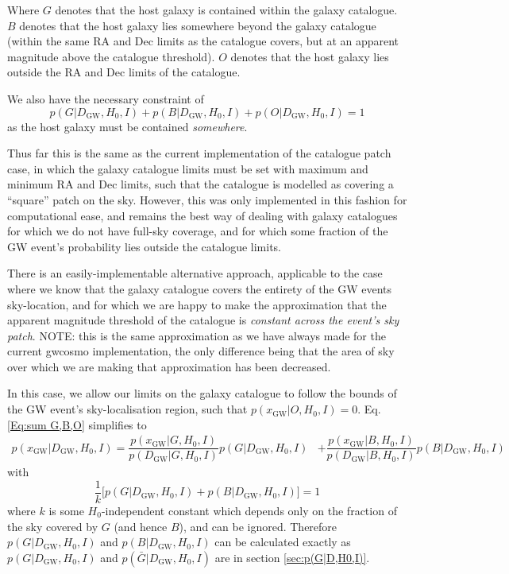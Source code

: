 \documentclass[a4paper,10pt]{article}
\begin{document}
Where $G$ denotes that the host galaxy is contained within the galaxy catalogue.  $B$ denotes that the host galaxy lies somewhere beyond the galaxy catalogue (within the same RA and Dec limits as the catalogue covers, but at an apparent magnitude above the catalogue threshold).  $O$ denotes that the host galaxy lies outside the RA and Dec limits of the catalogue.

We also have the necessary constraint of 
\begin{equation}
p(G|D_{\text{GW}},H_0,I) + p(B|D_{\text{GW}},H_0,I) + p(O|D_{\text{GW}},H_0,I) = 1
\end{equation}
as the host galaxy must be contained \emph{somewhere}.

Thus far this is the same as the current implementation of the catalogue patch case, in which the galaxy catalogue limits must be set with maximum and minimum RA and Dec limits, such that the catalogue is modelled as covering a ``square'' patch on the sky.  However, this was only implemented in this fashion for computational ease, and remains the best way of dealing with galaxy catalogues for which we do not have full-sky coverage, and for which some fraction of the GW event's probability lies outside the catalogue limits.

There is an easily-implementable alternative approach, applicable to the case where we know that the galaxy catalogue covers the entirety of the GW events sky-location, and for which we are happy to make the approximation that the apparent magnitude threshold of the catalogue is \emph{constant across the event's sky patch}. NOTE: this is the same approximation as we have always made for the current gwcosmo implementation, the only difference being that the area of sky over which we are making that approximation has been decreased.

In this case, we allow our limits on the galaxy catalogue to follow the bounds of the GW event's sky-localisation region, such that $p(x_{\text{GW}}|O,H_0,I)=0$.  Eq. \ref{Eq:sum G,B,O} simplifies to
\begin{equation} \label{Eq:sum G,B}
\begin{aligned}
p(x_{\text{GW}}|D_{\text{GW}},H_0,I) = \dfrac{p(x_{\text{GW}}|G,H_0,I)}{p(D_{\text{GW}}|G,H_0,I)} p(G|D_{\text{GW}},H_0,I) &+ \dfrac{p(x_{\text{GW}}|B,H_0,I)}{p(D_{\text{GW}}|B,H_0,I)} p(B|D_{\text{GW}},H_0,I)
\end{aligned} 
\end{equation}
with
\begin{equation}
\dfrac{1}{k} \big[ p(G|D_{\text{GW}},H_0,I) + p(B|D_{\text{GW}},H_0,I) \big] = 1
\end{equation}
where $k$ is some $H_0$-independent constant which depends only on the fraction of the sky covered by $G$ (and hence $B$), and can be ignored.  Therefore $p(G|D_{\text{GW}},H_0,I)$ and $p(B|D_{\text{GW}},H_0,I)$ can be calculated exactly as $p(G|D_{\text{GW}},H_0,I)$ and $p(\bar{G}|D_{\text{GW}},H_0,I)$ are in section \ref{sec:p(G|D,H0,I)}.
\end{document}

